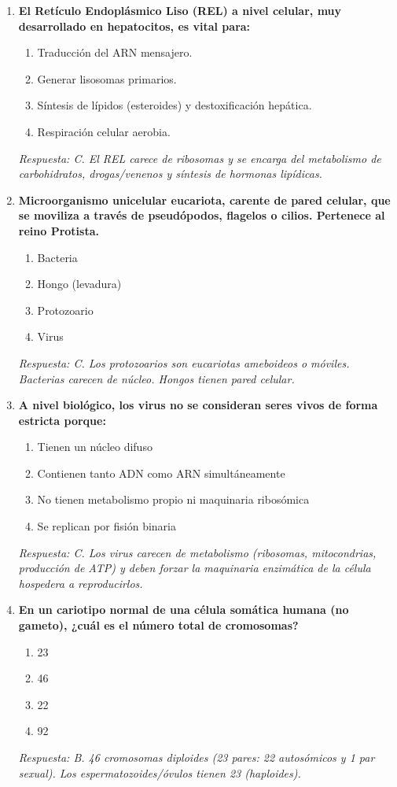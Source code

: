 \documentclass[spanish,letterpaper,oneside]{article}
\begin{document}
\begin{enumerate}[label=\textbf{\arabic*.}]
    \item \textbf{El Retículo Endoplásmico Liso (REL) a nivel celular, muy desarrollado en hepatocitos, es vital para:}
    \begin{enumerate}
        \item[A)] Traducción del ARN mensajero.
        \item[B)] Generar lisosomas primarios.
        \item[C)] Síntesis de lípidos (esteroides) y destoxificación hepática.
        \item[D)] Respiración celular aerobia.
    \end{enumerate}
    \textit{Respuesta: C. El REL carece de ribosomas y se encarga del metabolismo de carbohidratos, drogas/venenos y síntesis de hormonas lipídicas.}

    \item \textbf{Microorganismo unicelular eucariota, carente de pared celular, que se moviliza a través de pseudópodos, flagelos o cilios. Pertenece al reino Protista.}
    \begin{enumerate}
        \item[A)] Bacteria
        \item[B)] Hongo (levadura)
        \item[C)] Protozoario
        \item[D)] Virus
    \end{enumerate}
    \textit{Respuesta: C. Los protozoarios son eucariotas ameboideos o móviles. Bacterias carecen de núcleo. Hongos tienen pared celular.}

    \item \textbf{A nivel biológico, los virus no se consideran seres vivos de forma estricta porque:}
    \begin{enumerate}
        \item[A)] Tienen un núcleo difuso
        \item[B)] Contienen tanto ADN como ARN simultáneamente
        \item[C)] No tienen metabolismo propio ni maquinaria ribosómica
        \item[D)] Se replican por fisión binaria
    \end{enumerate}
    \textit{Respuesta: C. Los virus carecen de metabolismo (ribosomas, mitocondrias, producción de ATP) y deben forzar la maquinaria enzimática de la célula hospedera a reproducirlos.}

    \item \textbf{En un cariotipo normal de una célula somática humana (no gameto), ¿cuál es el número total de cromosomas?}
    \begin{enumerate}
        \item[A)] 23
        \item[B)] 46
        \item[C)] 22
        \item[D)] 92
    \end{enumerate}
    \textit{Respuesta: B. 46 cromosomas diploides (23 pares: 22 autosómicos y 1 par sexual). Los espermatozoides/óvulos tienen 23 (haploides).}


\end{enumerate}
\end{document}
